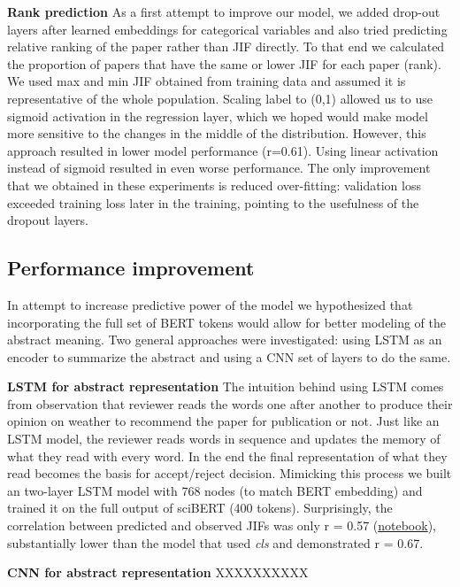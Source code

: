 \documentclass[11pt]{article}
\begin{document}
\textbf{Rank prediction} As a first attempt to improve our model, we added drop-out layers after learned embeddings for categorical variables and also tried predicting relative ranking of the paper rather than JIF directly. To that end we calculated the proportion of papers that have the same or lower JIF for each paper (rank). We used max and min JIF obtained from training data and assumed it is representative of the whole population. Scaling label to (0,1) allowed us to use sigmoid activation in the regression layer, which we hoped would make model more sensitive to the changes in the middle of the distribution. However, this approach resulted in lower model performance (r=0.61). Using linear activation instead of sigmoid resulted in even worse performance. The only improvement that we obtained in these experiments is reduced over-fitting: validation loss exceeded training loss later in the training, pointing to the usefulness of the dropout layers.

\subsection{Performance improvement}
In attempt to increase predictive power of the model we hypothesized that incorporating the full set of BERT tokens would allow for better modeling of the abstract meaning. Two general approaches were investigated: using LSTM as an encoder to summarize the abstract and using a CNN set of layers to do the same.

\textbf{LSTM for abstract representation} The intuition behind using LSTM comes from observation that reviewer reads the words one after another to produce their opinion on weather to recommend the paper for publication or not. Just like an LSTM model, the reviewer reads words in sequence and updates the memory of what they read with every word. In the end the final representation of what they read becomes the basis for accept/reject decision. Mimicking this process we built an two-layer LSTM model with 768 nodes (to match BERT embedding) and trained it on the full output of sciBERT (400 tokens). Surprisingly, the correlation between predicted and observed JIFs was only r = 0.57 (\href{https://github.com/ArtemChemist/w266_project/blob/main/Notebooks/sciBERT%20w%20meta%20to%20LSTM.ipynb}{notebook}), substantially lower than the model that used \textit{cls} and demonstrated r = 0.67.

\textbf{CNN for abstract representation} XXXXXXXXXX
\end{document}
